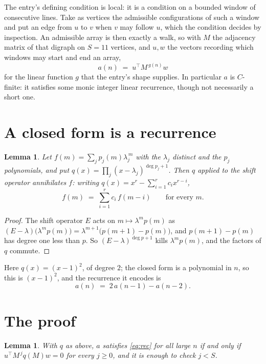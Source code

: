 \documentclass[11pt,a4paper]{article}
\theoremstyle{plain}
\newtheorem{lemma}[theorem]{Lemma}
\theoremstyle{definition}
\begin{document}
The entry's defining condition is local: it is a condition on a bounded window of consecutive lines. Take as vertices the
admissible configurations of such a window and put an edge from $u$ to $v$ when $v$ may
follow $u$, which the condition decides by inspection. An admissible array is then exactly a
walk, so with $M$ the adjacency matrix of that digraph on $S=11$ vertices, and $u,w$ the
vectors recording which windows may start and end an array,
\[
a(n)\;=\;u^{\!\top}M^{\,g(n)}w
\]
for the linear function $g$ that the entry's shape supplies. In particular $a$ is
$C$-finite: it satisfies some monic integer linear recurrence, though not necessarily a short
one.

\section{A closed form is a recurrence}

\begin{lemma}\label{lem:ann}
Let $f(m)=\sum_{j}p_j(m)\lambda_j^{\,m}$ with the $\lambda_j$ distinct and the $p_j$
polynomials, and put $q(x)=\prod_j(x-\lambda_j)^{\deg p_j+1}$. Then $q$ applied to the shift
operator annihilates $f$: writing $q(x)=x^{r}-\sum_{i=1}^{r}c_ix^{r-i}$,
\[
f(m)\;=\;\sum_{i=1}^{r}c_i\,f(m-i)\qquad\text{for every }m.
\]
\end{lemma}

\begin{proof}
The shift operator $E$ acts on $m\mapsto\lambda^{m}p(m)$ as
$(E-\lambda)\bigl(\lambda^{m}p(m)\bigr)=\lambda^{m+1}\bigl(p(m+1)-p(m)\bigr)$, and
$p(m+1)-p(m)$ has degree one less than $p$. So $(E-\lambda)^{\deg p+1}$ kills
$\lambda^{m}p(m)$, and the factors of $q$ commute.
\end{proof}

Here $q(x)=(x-1)^{2}$, of degree $2$; the closed form is a polynomial in $n$, so this is $(x-1)^{2}$, and the recurrence it encodes is
\begin{equation}\label{eq:rec}
a(n)\;=\;2\,a(n-1) - a(n-2).
\end{equation}

\section{The proof}

\begin{lemma}\label{lem:crit}
With $q$ as above, $a$ satisfies \eqref{eq:rec} for all large $n$ if and only if
$u^{\!\top}M^{\,j}q(M)w=0$ for every $j\ge0$, and it is enough to check $j<S$.
\end{lemma}
\end{document}
